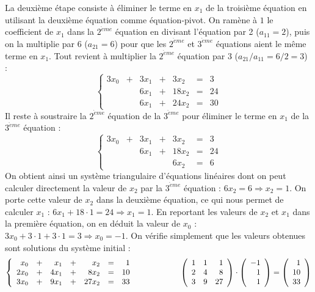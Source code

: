 La deuxième étape consiste à éliminer le terme en $x_1$ de la troisième équation
en utilisant la deuxième équation comme équation-pivot. On ramène à $1$ le coefficient 
de $x_1$ dans la $2^{\grave eme}$ équation en divisant l'équation par 2 ($a_{11} = 2$),
puis on la multiplie par 6 ($a_{21} = 6$) pour que les $2^{\grave eme}$ et 
$3^{\grave eme}$ équations aient le même terme en $x_1$. Tout revient à
multiplier la $2^{\grave eme}$ équation par 3 ($a_{21}/a_{11} = 6/2 = 3$) :
$$\left\{
\begin{array}{rcrcrcr}
3x_0 & + & 3x_1 & + &  3x_2 & = &  3 \\
     &   & 6x_1 & + & 18x_2 & = & 24 \\
     &   & 6x_1 & + & 24x_2 & = & 30
\end{array}
\right.$$
Il reste à soustraire la $2^{\grave eme}$ équation de la $3^{\grave eme}$
pour éliminer le terme en $x_1$ de la $3^{\grave eme}$ équation :
$$\left\{
\begin{array}{rcrcrcr}
3x_0 & + & 3x_1 & + &  3x_2 & = &  3 \\
     &   & 6x_1 & + & 18x_2 & = & 24 \\
     &   &      &   &  6x_2 & = &  6
\end{array}
\right.$$
On obtient ainsi un système triangulaire d'équations linéaires 
dont on peut calculer
directement la valeur de $x_2$ par la $3^{\grave eme}$ équation : $6x_2 =  6 \Rightarrow
x_2 = 1$. On porte cette valeur de $x_2$ dans la deuxième équation, ce qui nous permet de
calculer $x_1$ : $6x_1 + 18\cdot 1 = 24 \Rightarrow x_1 = 1$. En reportant les valeurs de
$x_2$ et $x_1$ dans la première équation, on en déduit la valeur de $x_0$ :
$3x_0 + 3\cdot 1 +  3\cdot 1 =  3 \Rightarrow x_0 = -1$. 
On vérifie simplement que
les valeurs obtenues sont solutions du système initial :
$$\left\{
\begin{array}{rcrcrcr}
 x_0 & + &  x_1 & + &   x_2 & = &  1 \\
2x_0 & + & 4x_1 & + &  8x_2 & = & 10 \\
3x_0 & + & 9x_1 & + & 27x_2 & = & 33
\end{array}
\right.
\hspace*{2cm}
\left(
\begin{array}{rrr}
1 & 1 &  1 \\
2 & 4 &  8 \\
3 & 9 & 27 
\end{array}
\right)
\cdot
\left(
\begin{array}{r}
-1 \\ 1 \\ 1
\end{array}
\right)
=
\left(
\begin{array}{r}
1 \\ 10 \\ 33
\end{array}
\right)$$

